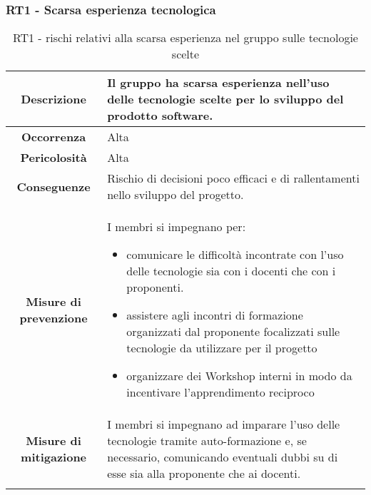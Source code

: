 \subsubsection[RT1]{RT1 - Scarsa esperienza tecnologica}\label{rt:1}
\begin{longtable}{|c|p{12cm}|}
\hline
\textbf{Descrizione} & Il gruppo ha scarsa esperienza nell'uso delle tecnologie scelte per lo sviluppo del prodotto software. \\
\hline
\textbf{Occorrenza} & Alta \\
\hline
\textbf{Pericolosità} & Alta \\
\hline
\textbf{Conseguenze} & Rischio di decisioni poco efficaci e di rallentamenti nello sviluppo del progetto.\\
\hline
\textbf{Misure di prevenzione} & I membri si impegnano per:
\begin{itemize}
    \item comunicare le difficoltà incontrate con l'uso delle tecnologie sia con i docenti che con i proponenti.
    \item assistere agli incontri di formazione organizzati dal proponente focalizzati sulle tecnologie da utilizzare per il progetto
    \item organizzare dei Workshop interni in modo da incentivare l'apprendimento reciproco
\end{itemize}
 \\
\hline
\textbf{Misure di mitigazione} & I membri si impegnano ad imparare l'uso delle tecnologie tramite auto-formazione e, se necessario, comunicando eventuali dubbi su di esse sia alla proponente che ai docenti. \\
\hline
\caption{RT1 - rischi relativi alla scarsa esperienza nel gruppo sulle tecnologie scelte}
\label{tab:scarsa-esperienza}
\end{longtable}

%
%
